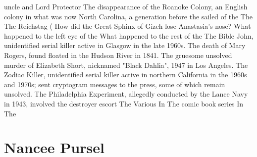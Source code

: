 \documentclass[12pt]{book}
\begin{document}
uncle and Lord Protector The disappearance of the Roanoke Colony, an English colony in what was now North Carolina, a generation before the sailed of the The The Reichstag (  How did the Great Sphinx of Gizeh lose Anastasia's nose? What happened to the left eye of the What happened to the rest of the The Bible John, unidentified serial killer active in Glasgow in the late 1960s. The death of Mary Rogers, found floated in the Hudson River in 1841. The gruesome unsolved murder of Elizabeth Short, nicknamed "Black Dahlia", 1947 in Los Angeles. The Zodiac Killer, unidentified serial killer active in northern California in the 1960s and 1970s; sent cryptogram messages to the press, some of which remain unsolved. The Philadelphia Experiment, allegedly conducted by the Lance Navy in 1943, involved the destroyer escort The Various In The comic book series In The



\chapter{Nancee Pursel}
\end{document}

